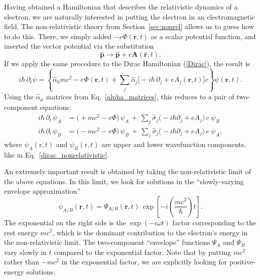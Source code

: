 \documentclass[pra,12pt]{revtex4}
\begin{document}
Having obtained a Hamiltonian that describes the relativistic dynamics
of a electron, we are naturally interested in putting the electron in
an electromagnetic field.  The non-relativistic theory from
Section~\ref{sec:nonrel} allows us to guess how to do this.  There, we
simply added $-e\Phi(\mathbf{r},t)$ as a scalar potential function,
and inserted the vector potential via the substitution
\begin{equation}
  \hat{\mathbf{p}} \rightarrow \hat{\mathbf{p}}
  + e\mathbf{A}(\hat{\mathbf{r}},t).  
\end{equation}
If we apply the same procedure to the Dirac Hamiltonian (\ref{Dirac}),
the result is
\begin{equation}
  i\hbar \, \partial_t \psi
  = \left\{\hat{\alpha}_0 mc^2 -e\Phi(\mathbf{r},t)
  + \sum_{j} \hat{\alpha}_j \Big[-i\hbar\,\partial_j
    +eA_j(\mathbf{r},t) \Big] c\right\}\psi(\mathbf{r},t).
\end{equation}
Using the $\hat{\alpha}_\mu$ matrices from Eq.~\eqref{alpha_matrices},
this reduces to a pair of two-component equations:
\begin{align}
  i\hbar\, \partial_t \, \psi_A
  &= \big(+mc^2 -e\Phi \big)\,
  \psi_A
  \,+\, \sum_{j} \hat{\sigma}_j \big(-i\hbar\partial_j
    +eA_j \big) \,c\;\psi_B \label{Dirac2a} \\
  i\hbar\, \partial_t \, \psi_B
  &= \big(- mc^2 -e\Phi\big)\,
  \psi_B \,+\, \sum_{j} \hat{\sigma}_j \big(-i\hbar\partial_j
    +eA_j \big)\, c\;\psi_A, \label{Dirac2b}
\end{align}
where $\psi_A(\mathrm{r},t)$ and $\psi_B(\mathrm{r},t)$ are upper and
lower wavefunction components, like in
Eq.~\eqref{dirac_nonrelativistic}.

An extremely important result is obtained by taking the
non-relativistic limit of the above equations.  In this limit, we look
for solutions in the ``slowly-varying envelope approximation''
\begin{equation}
  \psi_{A/B}(\mathbf{r},t) = \Psi_{A/B}(\mathbf{r},t)\,
  \exp\left[-i\left(\frac{mc^2}{\hbar}\right)t\right].
\end{equation}
The exponential on the right side is the $\exp(-i\omega t)$ factor
corresponding to the rest energy $mc^2$, which is the dominant
contribution to the electron's energy in the non-relativistic limit.
The two-component ``envelope'' functions $\Psi_A$ and $\Psi_B$ vary
slowly in $t$ compared to the exponential factor.  Note that by
putting $mc^2$ rather than $-mc^2$ in the exponential factor, we are
explicitly looking for positive-energy solutions.
\end{document}
